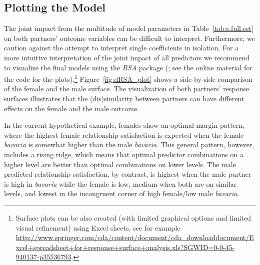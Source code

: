 \documentclass[jou,a4paper,draftfirst]{apa6}
\begin{document}
\subsection{Plotting the Model}
The joint impact from the multitude of model parameters in Table~\ref{tab:s.full.est} on both partners' outcome variables can be difficult to interpret. Furthermore, we caution against the attempt to interpret single coefficients in isolation. For a more intuitive interpretation of the joint impact of all predictors we recommend to visualize the final models using the \emph{RSA} package (; see the online material for the code for the plots).\footnote{Surface plots can be also created (with limited graphical options and limited visual refinement) using Excel sheets, see for example \url{http://www.springer.com/cda/content/document/cda_downloaddocument/Excel+spreadsheet+for+response+surface+analysis.xls?SGWID=0-0-45-940137-p35536793}.} Figure~\ref{fig:dRSA_plot} shows a side-by-side comparison of the female and the male surface. The visualization of both partners' response surfaces illustrates that the (dis)similarity between partners can have different effects on the female and the male outcome. 

In the current hypothetical example, females show an optimal margin pattern, where the highest female relationship satisfaction is expected when the female \emph{bavaria} is somewhat higher than the male \emph{bavaria}. This general pattern, however, includes a rising ridge, which means that optimal predictor combinations on a higher level are better than optimal combinations on lower levels. The male predicted relationship satisfaction, by contrast, is highest when the male partner is high in \emph{bavaria} while the female is low, medium when both are on similar levels, and lowest in the incongruent corner of high female/low male \emph{bavaria}.

\begin{figure*}[ht!]
\centering
{}
\caption{Female and male response surface from the DRSA. Raw data points are plotted at their predicted value (i.e., they are projected onto the response surface). Figure available at \url{https://osf.io/ftsrd/}, under a CC-BY4.0 license.}
\label{fig:dRSA_plot}
\end{figure*}
\end{document}
